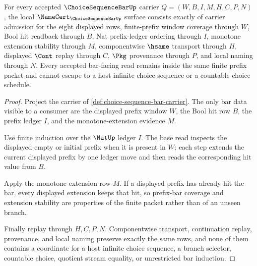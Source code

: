 \begin{theorem}
\label{thm:choice-sequence-bar-namecert-obligations}
For every accepted $\ChoiceSequenceBarUp$ carrier $Q=(W,B,I,M,H,C,P,N)$, the local $\NameCert_{\ChoiceSequenceBarUp}$ surface consists exactly of carrier admission for the eight displayed rows, finite-prefix window coverage through $W$, Bool hit readback through $B$, Nat prefix-ledger ordering through $I$, monotone extension stability through $M$, componentwise $\hsame$ transport through $H$, displayed $\Cont$ replay through $C$, $\Pkg$ provenance through $P$, and local naming through $N$. Every accepted bar-facing read remains inside the same finite prefix packet and cannot escape to a host infinite choice sequence or a countable-choice schedule.
\end{theorem}
\begin{proof}
Project the carrier of \autoref{def:choice-sequence-bar-carrier}. The only bar data visible to a consumer are the displayed prefix window $W$, the Bool hit row $B$, the prefix ledger $I$, and the monotone-extension evidence $M$.

Use finite induction over the $\NatUp$ ledger $I$. The base read inspects the displayed empty or initial prefix when it is present in $W$; each step extends the current displayed prefix by one ledger move and then reads the corresponding hit value from $B$.

Apply the monotone-extension row $M$. If a displayed prefix has already hit the bar, every displayed extension keeps that hit, so prefix-bar coverage and extension stability are properties of the finite packet rather than of an unseen branch.

Finally replay through $H,C,P,N$. Componentwise transport, continuation replay, provenance, and local naming preserve exactly the same rows, and none of them contains a coordinate for a host infinite choice sequence, a branch selector, countable choice, quotient stream equality, or unrestricted bar induction.
\end{proof}



